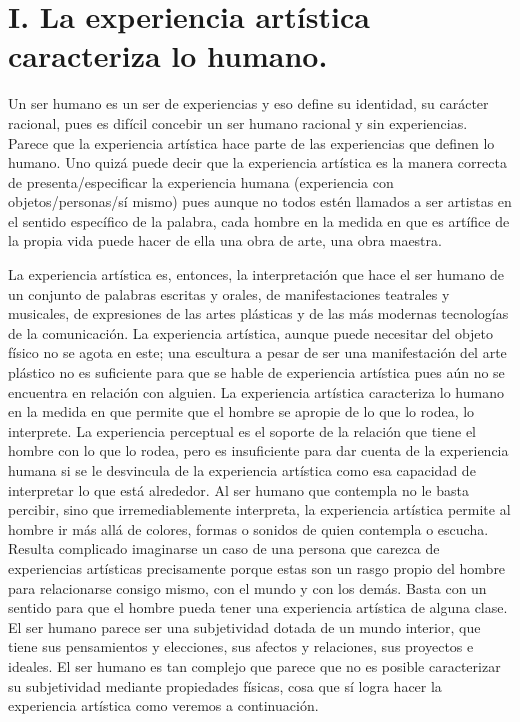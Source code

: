 \documentclass[]{book}
\begin{document}
\section*{I. La experiencia artística caracteriza lo humano.}

Un ser humano es un ser de experiencias y eso define su identidad, su
carácter racional, pues es difícil concebir un ser humano racional y sin
experiencias. Parece que la experiencia artística hace parte de las
experiencias que definen lo humano. Uno quizá puede decir que la
experiencia artística es la manera correcta de presenta/especificar la
experiencia humana (experiencia con objetos/personas/sí mismo) pues
aunque no todos estén llamados a ser artistas en el sentido específico
de la palabra, cada hombre en la medida en que es artífice de la propia
vida puede hacer de ella una obra de arte, una obra maestra.

La experiencia artística es, entonces, la interpretación que hace el ser
humano de un conjunto de palabras escritas y orales, de manifestaciones
teatrales y musicales, de expresiones de las artes plásticas y de las
más modernas tecnologías de la comunicación. La experiencia artística,
aunque puede necesitar del objeto físico no se agota en este; una
escultura a pesar de ser una manifestación del arte plástico no es
suficiente para que se hable de experiencia artística pues aún no se
encuentra en relación con alguien. La experiencia artística caracteriza
lo humano en la medida en que permite que el hombre se apropie de lo que
lo rodea, lo interprete. La experiencia perceptual es el soporte de la
relación que tiene el hombre con lo que lo rodea, pero es insuficiente
para dar cuenta de la experiencia humana si se le desvincula de la
experiencia artística como esa capacidad de interpretar lo que está
alrededor. Al ser humano que contempla no le basta percibir, sino que
irremediablemente interpreta, la experiencia artística permite al hombre
ir más allá de colores, formas o sonidos de quien contempla o escucha.
Resulta complicado imaginarse un caso de una persona que carezca de
experiencias artísticas precisamente porque estas son un rasgo propio
del hombre para relacionarse consigo mismo, con el mundo y con los
demás. Basta con un sentido para que el hombre pueda tener una
experiencia artística de alguna clase. El ser humano parece ser una
subjetividad dotada de un mundo interior, que tiene sus pensamientos y
elecciones, sus afectos y relaciones, sus proyectos e ideales. El ser
humano es tan complejo que parece que no es posible caracterizar su
subjetividad mediante propiedades físicas, cosa que sí logra hacer la
experiencia artística como veremos a continuación.
\end{document}
